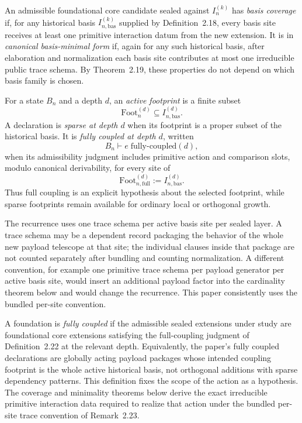 \documentclass{lmcs}
\begin{document}
\begin{defi}
An admissible foundational core candidate sealed against \(I_n^{(k)}\) has \emph{basis
coverage} if, for any historical basis \(I_{n,\mathrm{bas}}^{(k)}\) supplied by
Definition~2.18, every basis site receives at least one primitive interaction datum from the
new extension.  It is in \emph{canonical basis-minimal form} if, again for any such historical
basis, after elaboration and normalization each basis site contributes at most one irreducible
public trace schema.  By Theorem~2.19, these properties do not depend on which basis family
is chosen.
\end{defi}

\begin{defi}
For a state \(B_n\) and a depth \(d\), an \emph{active footprint} is a finite subset
\[
  \mathrm{Foot}^{(d)}_n \subseteq I_{n,\mathrm{bas}}^{(d)}.
\]
A declaration is \emph{sparse at depth \(d\)} when its footprint is a proper subset of the
historical basis.  It is \emph{fully coupled at depth \(d\)}, written
\[
  B_n \vdash e\;\mathrm{fully\mbox{-}coupled}(d),
\]
when its admissibility judgment includes primitive action and comparison slots, modulo
canonical derivability, for every site of
\[
  \mathrm{Foot}^{(d)}_{n,\mathrm{full}} := I_{n,\mathrm{bas}}^{(d)}.
\]
Thus full coupling is an explicit hypothesis about the selected footprint, while sparse
footprints remain available for ordinary local or orthogonal growth.
\end{defi}

\begin{rem}
The recurrence uses one trace schema per active basis site per sealed layer.  A trace schema
may be a dependent record packaging the behavior of the whole new payload telescope at that
site; the individual clauses inside that package are not counted separately after bundling and
counting normalization.  A different convention, for example one primitive trace schema per
payload generator per active basis site, would insert an additional payload factor into the
cardinality theorem below and would change the recurrence.  This paper consistently uses the
bundled per-site convention.
\end{rem}

\begin{defi}
A foundation is \emph{fully coupled} if the admissible sealed extensions under study are
foundational core extensions satisfying the full-coupling judgment of Definition~2.22 at the
relevant depth.  Equivalently, the paper's fully coupled declarations are globally acting
payload packages whose intended coupling footprint is the whole active historical basis, not
orthogonal additions with sparse dependency patterns.  This definition fixes the scope of the
action as a hypothesis.  The coverage and minimality theorems below derive the exact
irreducible primitive interaction data required to realize that action under the bundled
per-site trace convention of Remark~2.23.
\end{defi}
\end{document}
